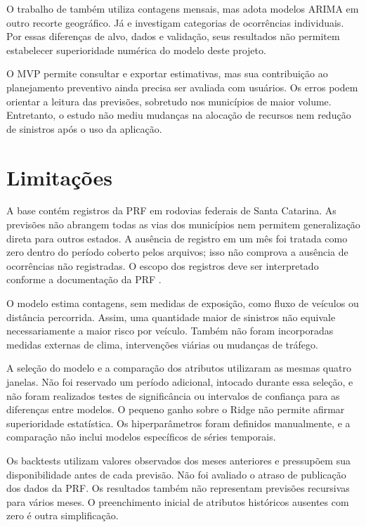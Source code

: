 \documentclass[12pt]{article}
\begin{document}
O trabalho de \cite{getahun2021timeseries} também utiliza contagens mensais, mas adota modelos ARIMA em outro recorte geográfico. Já \cite{rosa2024classificacao} e \cite{mafort2025tecnicas} investigam categorias de ocorrências individuais. Por essas diferenças de alvo, dados e validação, seus resultados não permitem estabelecer superioridade numérica do modelo deste projeto.

O MVP permite consultar e exportar estimativas, mas sua contribuição ao planejamento preventivo ainda precisa ser avaliada com usuários. Os erros podem orientar a leitura das previsões, sobretudo nos municípios de maior volume. Entretanto, o estudo não mediu mudanças na alocação de recursos nem redução de sinistros após o uso da aplicação.

\section{Limitações}

A base contém registros da PRF em rodovias federais de Santa Catarina. As previsões não abrangem todas as vias dos municípios nem permitem generalização direta para outros estados. A ausência de registro em um mês foi tratada como zero dentro do período coberto pelos arquivos; isso não comprova a ausência de ocorrências não registradas. O escopo dos registros deve ser interpretado conforme a documentação da PRF \cite{prf2026portal}.

O modelo estima contagens, sem medidas de exposição, como fluxo de veículos ou distância percorrida. Assim, uma quantidade maior de sinistros não equivale necessariamente a maior risco por veículo. Também não foram incorporadas medidas externas de clima, intervenções viárias ou mudanças de tráfego.

A seleção do modelo e a comparação dos atributos utilizaram as mesmas quatro janelas. Não foi reservado um período adicional, intocado durante essa seleção, e não foram realizados testes de significância ou intervalos de confiança para as diferenças entre modelos. O pequeno ganho sobre o Ridge não permite afirmar superioridade estatística. Os hiperparâmetros foram definidos manualmente, e a comparação não inclui modelos específicos de séries temporais.

Os backtests utilizam valores observados dos meses anteriores e pressupõem sua disponibilidade antes de cada previsão. Não foi avaliado o atraso de publicação dos dados da PRF. Os resultados também não representam previsões recursivas para vários meses. O preenchimento inicial de atributos históricos ausentes com zero é outra simplificação.
\end{document}
